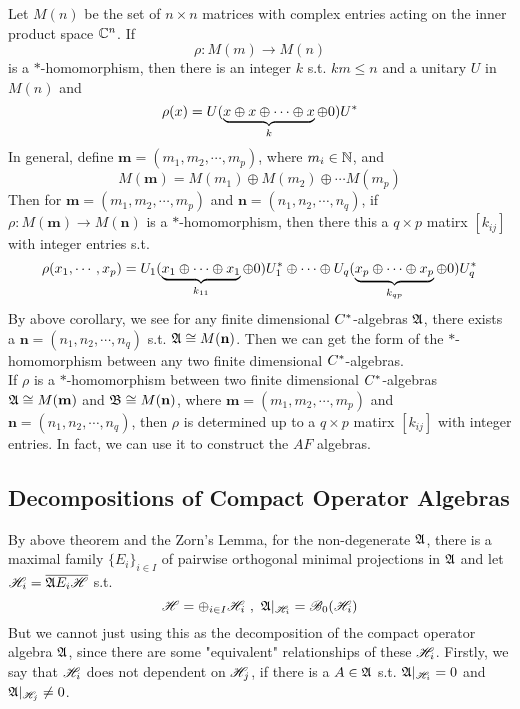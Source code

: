 \begin{exam}
	Let $M(n)$ be the set of $n \times n$ matrices with complex entries acting on the inner product space $\mathbb{C}^{n}$. If
	\begin{equation*}
		\rho \colon M(m) \longrightarrow M(n)
	\end{equation*}
	is a $*$-homomorphism, then there is an integer $k$ s.t. $km \leqslant n$ and a unitary $U$ in $M(n)$ and 
	\begin{equation*}
		\rho(x) = U(\underbrace{x \oplus x \oplus \cdots \oplus x}_k \oplus 0)U^{*}
	\end{equation*}
	In general, define $\mathbf{m} = (m_1, m_2, \cdots, m_p)$, where $m_i \in \mathbb{N}$, and
	\begin{equation*}
		M(\mathbf{m}) = M(m_1) \oplus M(m_2) \oplus \cdots M(m_p)
	\end{equation*}
	Then for $\mathbf{m} = (m_1, m_2, \cdots, m_p)$ and $\mathbf{n}=(n_1, n_2, \cdots, n_q)$, if $\rho \colon M(\mathbf{m}) \rightarrow M(\mathbf{n})$ is a $*$-homomorphism, then there this a $q \times p$ matirx $[k_{ij}]$ with integer entries s.t.
	\begin{equation*}
		\rho(x_1,\cdots,x_p) = U_1(\underbrace{x_1 \oplus \cdots \oplus x_1}_{k_{11}} \oplus 0)U^{*}_1 \oplus \cdots \oplus U_q(\underbrace{x_p \oplus \cdots \oplus x_p}_{k_{qp}} \oplus 0)U^{*}_q
	\end{equation*}
	By above corollary, we see for any finite dimensional $C^{*}$-algebras $\mathfrak{A}$, there exists a $\mathbf{n}=(n_1, n_2, \cdots, n_q)$ s.t. $\mathfrak{A} \cong M(\mathbf{n})$. Then we can get the form of the $*$-homomorphism between any two finite dimensional $C^{*}$-algebras. \\
	If $\rho$ is a $*$-homomorphism between two finite dimensional $C^{*}$-algebras\\ $\mathfrak{A} \cong M(\mathbf{m})$ and $\mathfrak{B} \cong M(\mathbf{n})$, where $\mathbf{m} = (m_1, m_2, \cdots, m_p)$ and $\mathbf{n}=(n_1, n_2, \cdots, n_q)$, then $\rho$ is determined up to a $q \times p$ matirx $[k_{ij}]$ with integer entries. In fact, we can use it to construct the $AF$ algebras.
\end{exam}

\subsection{Decompositions of Compact Operator Algebras}

By above theorem and the Zorn's Lemma, for the non-degenerate $\mathfrak{A}$, there is a maximal family $\{E_i\}_{i \in I}$ of pairwise orthogonal minimal projections in $\mathfrak{A}$ and let $\mathscr{H}_i = \overline{\mathfrak{A} E_i \mathscr{H}}$ s.t.
\begin{equation*}
	\mathscr{H} = \oplus_{i \in I} \mathscr{H}_i~,~ \mathfrak{A}|_{\mathscr{H}_i} = \mathscr{B}_0(\mathscr{H}_i)
\end{equation*}
But we cannot just using this as the decomposition of the compact operator algebra $\mathfrak{A}$, since there are some "equivalent" relationships of these $\mathscr{H}_i$. Firstly, we say that $\mathscr{H}_i$ does not dependent on $\mathscr{H}_j$, if there is a $A \in \mathfrak{A}$ s.t. $\mathfrak{A}|_{\mathscr{H}_i} = 0$ and $\mathfrak{A}|_{\mathscr{H}_j} \neq 0$.

